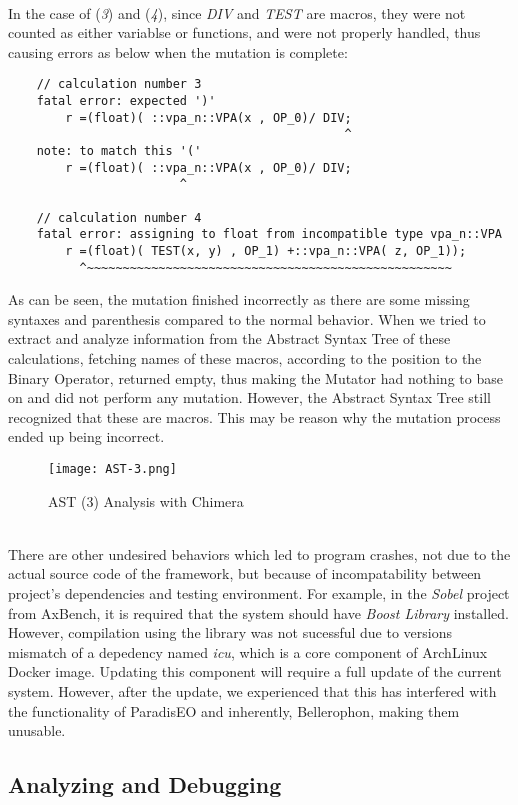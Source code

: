 ~\\
In the case of (\textit{3}) and (\textit{4}), since \textit{DIV} and \textit{TEST} are macros, they were not counted as either variablse or functions, and were not properly handled, thus causing errors as below when the mutation is complete:
\begin{verbatim}
	// calculation number 3
	fatal error: expected ')'
        r =(float)( ::vpa_n::VPA(x , OP_0)/ DIV;
        									   ^
	note: to match this '('
        r =(float)( ::vpa_n::VPA(x , OP_0)/ DIV;
                        ^

	// calculation number 4
	fatal error: assigning to float from incompatible type vpa_n::VPA
        r =(float)( TEST(x, y) , OP_1) +::vpa_n::VPA( z, OP_1));
          ^~~~~~~~~~~~~~~~~~~~~~~~~~~~~~~~~~~~~~~~~~~~~~~~~~~~
\end{verbatim}
As can be seen, the mutation finished incorrectly as there are some missing syntaxes and parenthesis compared to the normal behavior. When we tried to extract and analyze information from the Abstract Syntax Tree of these calculations, fetching names of these macros, according to the position to the Binary Operator, returned empty, thus making the Mutator had nothing to base on and did not perform any mutation. However, the Abstract Syntax Tree still recognized that these are macros. This may be reason why the mutation process ended up being incorrect. \\
\begin{figure}[H]
\texttt{[image: AST-3.png]}
\centering
\caption{AST (3) Analysis with Chimera}
\end{figure}
~\\
There are other undesired behaviors which led to program crashes, not due to the actual source code of the framework, but because of incompatability between project's dependencies and testing environment. For example, in the \textit{Sobel} project from AxBench, it is required that the system should have \textit{Boost Library} installed. However, compilation using the library was not sucessful due to versions mismatch of a depedency named \textit{icu}, which is a core component of ArchLinux Docker image. Updating this component will require a full update of the current system. However, after the update, we experienced that this has interfered with the functionality of ParadisEO and inherently, Bellerophon, making them unusable. \\

\subsection{Analyzing and Debugging}

